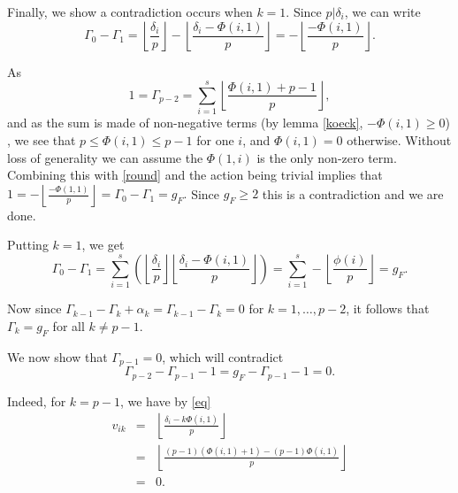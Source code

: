 \documentclass[11pt]{article} %
\theoremstyle{remark}\newtheorem*{rem}{Remark}
\begin{document}
Finally, we show a contradiction occurs when $k = 1$.
Since $p| \delta_i$, we can write
\begin{equation}\label{round}
 \Gamma_0 - \Gamma_1 = \left\lfloor \frac{\delta_i}{p} \right\rfloor -\left\lfloor \frac{\delta_i - \Phi(i,1)}{p} \right\rfloor = -\left\lfloor \frac{-\Phi(i,1)}{p} \right\rfloor.
\end{equation}

As 
\[
 1 = \Gamma_{p-2} = \sum_{i=1}^s\left\lfloor \frac{\Phi(i,1) + p -1}{p} \right\rfloor,
\]
 and as the sum is made of non-negative terms (by lemma \ref{koeck}, $-\Phi(i,1) \geq 0$) , we see that $p \leq \Phi(i,1) \leq p-1$ for one $i$, and $\Phi(i,1) = 0$ otherwise.
Without loss of generality we can assume the $\Phi(1,i)$ is the only non-zero term.
Combining this with \ref{round} and the action being trivial implies that $1 = -\left\lfloor \frac{-\Phi(1,1)}{p} \right\rfloor = \Gamma_0 - \Gamma_1 = g_F.$
Since $g_F \geq 2$ this is a contradiction and we are done.


\newpage


Putting $k=1$, we get 
\[
\Gamma_0 - \Gamma_1 = \sum_{i=1}^s\left(\left\lfloor \frac{\delta_i}{p} \right\rfloor \left\lfloor \frac{\delta_i - \Phi(i,1)}{p} \right\rfloor \right) = \sum_{i=1}^s - \left\lfloor \frac{\phi(i)}{p} \right\rfloor = g_F.
\]

Now since $\Gamma_{k-1}-\Gamma_k+\alpha_k = \Gamma_{k-1}-\Gamma_k = 0$ for $k=1,\ldots ,p-2$, it follows that $\Gamma_k=g_F$ for all $k\neq p-1$.

We now show that $\Gamma_{p-1} = 0$, which will contradict
\[
 \Gamma_{p-2} - \Gamma_{p-1} - 1 = g_F - \Gamma_{p-1} - 1 = 0.
\]


Indeed, for $k = p-1$, we have by \ref{eq}
\begin{eqnarray*}
v_{ik} & = & \left \lfloor \frac{\delta_i - k\Phi(i,1)}{p} \right\rfloor \\
	& = & \left\lfloor \frac{(p-1)(\Phi(i,1) + 1) - (p-1)\Phi(i,1)}{p} \right\rfloor\\
	& = & 0.
\end{eqnarray*}





\end{document}

